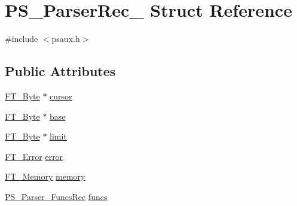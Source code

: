 \hypertarget{struct_p_s___parser_rec__}{\section{P\-S\-\_\-\-Parser\-Rec\-\_\- Struct Reference}
\label{struct_p_s___parser_rec__}
}


{\ttfamily \#include $<$psaux.\-h$>$}

\subsection*{Public Attributes}
\begin{DoxyCompactItemize}
\item 
\hyperlink{fttypes_8h_a51f26183ca0c9f4af958939648caeccd}{F\-T\-\_\-\-Byte} $\ast$ \hyperlink{struct_p_s___parser_rec___a6ed189bc25c03814bdafad63819ddfe7}{cursor}
\item 
\hyperlink{fttypes_8h_a51f26183ca0c9f4af958939648caeccd}{F\-T\-\_\-\-Byte} $\ast$ \hyperlink{struct_p_s___parser_rec___a30528f6a9caffce2fd44ef2d5a38e5bd}{base}
\item 
\hyperlink{fttypes_8h_a51f26183ca0c9f4af958939648caeccd}{F\-T\-\_\-\-Byte} $\ast$ \hyperlink{struct_p_s___parser_rec___af3310795fd73530036fb32ec4385ea3d}{limit}
\item 
\hyperlink{fttypes_8h_a64c8060bdb3d6eec844a1bf670e06bdd}{F\-T\-\_\-\-Error} \hyperlink{struct_p_s___parser_rec___a7a1432cb4d8bb603663f1258224c8ec4}{error}
\item 
\hyperlink{ftsystem_8h_a67ec7ea35cde99a89a65e9f827a9ad3a}{F\-T\-\_\-\-Memory} \hyperlink{struct_p_s___parser_rec___a3e2206deb6c0d73f51c8c71d5db1db1f}{memory}
\item 
\hyperlink{psaux_8h_a73ccaa98f37bcac7d3e302148011beb6}{P\-S\-\_\-\-Parser\-\_\-\-Funcs\-Rec} \hyperlink{struct_p_s___parser_rec___a450031fd9e77e55bf424dc64a8d2659d}{funcs}
\end{DoxyCompactItemize}


